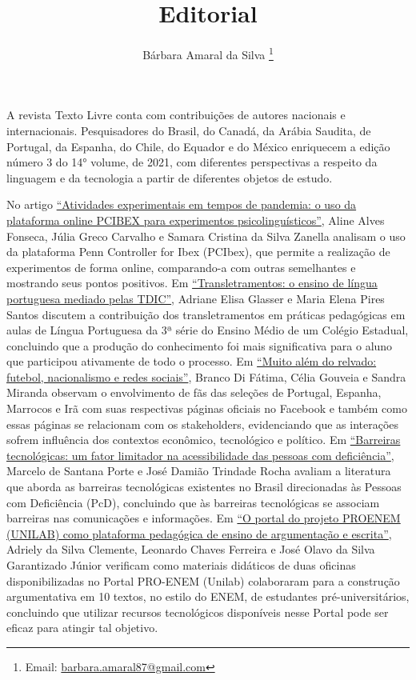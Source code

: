 \documentclass{textolivre}
\title{Editorial}
\author[1]{Bárbara Amaral da Silva \orcid{0000-0002-1469-9575} \thanks{Email: \url{barbara.amaral87@gmail.com}}}
\affil[1]{University of Windsor, Windsor, Canadá; Universidade Federal de Minas Gerais, Belo Horizont-MG, Brasil.}
\begin{document}
\maketitle

A revista Texto Livre conta com contribuições de autores nacionais e internacionais. Pesquisadores do Brasil, do Canadá, da Arábia Saudita, de Portugal, da Espanha, do Chile, do Equador e do México enriquecem a edição número 3 do 14° volume, de 2021, com diferentes perspectivas a respeito da linguagem e da tecnologia a partir de diferentes objetos de estudo. 

No artigo \href{https://doi.org/10.35699/1983-3652.2021.27047}{“Atividades experimentais em tempos de pandemia: o uso da plataforma online PCIBEX para experimentos psicolinguísticos”}, Aline Alves Fonseca, Júlia Greco Carvalho e Samara Cristina da Silva Zanella analisam o uso da plataforma Penn Controller for Ibex (PCIbex), que permite a realização de experimentos de forma online, comparando-a com outras semelhantes e mostrando seus pontos positivos. Em \href{https://doi.org/10.35699/1983-3652.2021.29627}{“Transletramentos: o ensino de língua portuguesa mediado pelas TDIC”}, Adriane Elisa Glasser e Maria Elena Pires Santos discutem a contribuição dos transletramentos em práticas pedagógicas em aulas de Língua Portuguesa da 3ª série do Ensino Médio de um Colégio Estadual, concluindo que a produção do conhecimento foi mais significativa para o aluno que participou ativamente de todo o processo. Em \href{https://doi.org/10.35699/1983-3652.2021.29714}{“Muito além do relvado: futebol, nacionalismo e redes sociais”}, Branco Di Fátima, Célia Gouveia e Sandra Miranda observam o envolvimento de fãs das seleções de Portugal, Espanha, Marrocos e Irã com suas respectivas páginas oficiais no Facebook e também como essas páginas se relacionam com os stakeholders, evidenciando que as interações sofrem influência dos contextos econômico, tecnológico e político. Em \href{https://doi.org/10.35699/1983-3652.2021.32563}{“Barreiras tecnológicas: um fator limitador na acessibilidade das pessoas com deficiência”}, Marcelo de Santana Porte e José Damião Trindade Rocha avaliam a literatura que aborda as barreiras tecnológicas existentes no Brasil direcionadas às Pessoas com Deficiência (PcD), concluindo que às barreiras tecnológicas se associam barreiras nas comunicações e informações. Em \href{https://doi.org/10.35699/1983-3652.2021.33162}{“O portal do projeto PROENEM (UNILAB) como plataforma pedagógica de ensino de argumentação e escrita”}, Adriely da Silva Clemente, Leonardo Chaves Ferreira e José Olavo da Silva Garantizado Júnior verificam como materiais didáticos de duas oficinas disponibilizadas no Portal PRO-ENEM (Unilab) colaboraram para a construção argumentativa em 10 textos, no estilo do ENEM, de estudantes pré-universitários, concluindo que utilizar recursos tecnológicos disponíveis nesse Portal pode ser eficaz para atingir tal objetivo. 
\end{document}
